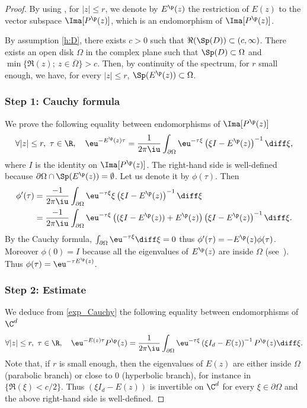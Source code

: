 \begin{proof}
By using , for $|z| \leq r$, we denote by $E^\p(z)$ the restriction of $E(z)$ to the vector subspace $\Ima[P^\p(z)]$, which is an endomorphism of $\Ima[P^\p(z)]$.

By assumption \eqref{h:D}, there exists $c>0$ such that $\Re(\Sp(D)) \subset (c, \infty)$.
There exists an open disk $\Omega$ in the complex plane such that $\Sp(D) \subset \Omega$ and $\min\{ \Re(z);\ z\in \overline{\Omega} \} >c$. Then, by continuity of the spectrum, for $r$ small enough, we have, for every $|z|\leq r$, $\Sp(E^\p(z)) \subset \Omega$.

\subsubsection*{Step 1: Cauchy formula}
We prove the following equality between endomorphisms of $\Ima[P^\p(z)]$
\begin{equation} \label{exp_Cauchy}
\forall |z|\leq r,\ \tau \in \R, \quad
\eu^{ -E^\p (z)\tau}=\frac{1}{2\pi \iu } \int_{\partial\Omega} \eu^{-\tau \xi} \left(\xi I - E^\p(z) \right)^{-1} \diff\xi,
\end{equation}
where $I$ is the identity on $\Ima[P^\p(z)]$.
The right-hand side is well-defined because $\partial\Omega \cap\Sp(E^\p(z)) = \emptyset$. Let us denote it by $\phi(\tau)$.
Then
\begin{align*}
\phi'(\tau) & =\frac{-1}{2\pi \iu } \int_{\partial\Omega} \eu^{-\tau \xi} \xi \left(\xi I - E^\p(z) \right)^{-1} \diff\xi
\\ & = \frac{-1}{2\pi \iu } \int_{\partial\Omega} \eu^{-\tau \xi} \left((\xi I - E^\p(z))+E^\p(z) \right) \left(\xi I - E^\p(z) \right)^{-1} \diff\xi.
\end{align*}
By the Cauchy formula, $\int_{\partial\Omega} \eu^{-\tau \xi} \diff\xi=0$ thus
$\phi'(\tau)=-E^\p(z)\phi(\tau)$. Moreover $\phi(0)=I$ because all the eigenvalues of $E^\p(z)$ are inside $\Omega$ (see~\cite[Ch.\,I, Prob.\,5.9]{kato_1995}). Thus $\phi(\tau)=\eu^{-\tau E^\p(z)}$.

\subsubsection*{Step 2: Estimate}
We deduce from \eqref{exp_Cauchy} the following equality between endomorphisms of $\C^d$
\begin{equation} \label{exp_Cauchy_Pp}
\forall |z|\leq r,\ \tau \in \R, \quad
\eu^{ - E (z)\tau} P^\p(z) =\frac{1}{2\pi \iu } \int_{\partial\Omega} \eu^{-\tau \xi} \left(\xi I_d - E(z) \right)^{-1} P^\p(z) \diff\xi.
\end{equation}
Note that, if $r$ is small enough, then the eigenvalues of $E(z)$ are either inside $\Omega$ (parabolic branch) or close to $0$ (hyperbolic branch), for instance in $\{ \Re(\xi) < c/2 \}$. Thus $\left(\xi I_d - E(z) \right)$ is invertible on $\C^d$ for every $\xi \in \partial\Omega$ and the above right-hand side is well-defined.


\end{proof}
